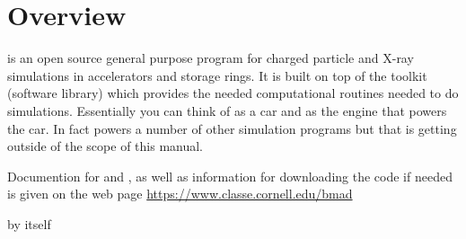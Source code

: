\chapter{Overview}

\tao is an open source general purpose program for charged particle and X-ray simulations in
accelerators and storage rings. It is built on top of the \bmad toolkit (software library) which
provides the needed computational routines needed to do simulations. Essentially you can think of
\tao as a car and \bmad as the engine that powers the car. In fact \bmad powers a number of other
simulation programs but that is getting outside of the scope of this manual. 

Documention for \bmad and \tao, as well as information for downloading the code if needed is given
on the \bmad web page
\hfill\break
\hspace*{0.3in} \url{https://www.classe.cornell.edu/bmad}

\tao by itself 


